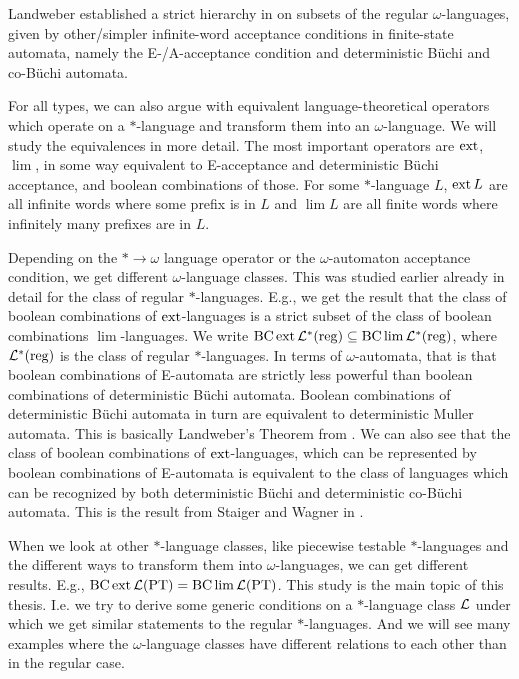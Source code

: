 Landweber established a strict hierarchy in \cite{Landweber69} on subsets of the regular $\omega$-languages, given by other/simpler infinite-word acceptance conditions in finite-state automata, namely the E-/A-acceptance condition and deterministic Büchi and co-Büchi automata.

For all types, we can also argue with equivalent language-theoretical operators which operate on a $*$-language and transform them into an $\omega$-language. We will study the equivalences in more detail. The most important operators are $\operatorname{ext}$, $\lim$, in some way equivalent to E-acceptance and deterministic Büchi acceptance, and boolean combinations of those. For some $*$-language $L$, $\operatorname{ext} L$ are all infinite words where some prefix is in $L$ and $\lim L$ are all finite words where infinitely many prefixes are in $L$.

Depending on the $* \rightarrow \omega$ language operator or the $\omega$-automaton acceptance condition, we get different $\omega$-language classes. This was studied earlier already in detail for the class of regular $*$-languages. E.g., we get the result that the class of boolean combinations of $\operatorname{ext}$-languages is a strict subset of the class of boolean combinations $\lim$-languages. We write $\operatorname{BC} \operatorname{ext} \mathcal{L}^*(\textup{\textrm{reg}}) \subseteq \operatorname{BC} \lim \mathcal{L}^*(\textup{\textrm{reg}})$, where $\mathcal{L}^*(\textup{\textrm{reg}})$ is the class of regular $*$-languages. In terms of $\omega$-automata, that is that boolean combinations of E-automata are strictly less powerful than boolean combinations of deterministic Büchi automata. Boolean combinations of deterministic Büchi automata in turn are equivalent to deterministic Muller automata. This is basically Landweber's Theorem from \cite{Landweber69}. We can also see that the class of boolean combinations of $\operatorname{ext}$-languages, which can be represented by boolean combinations of E-automata is equivalent to the class of languages which can be recognized by both deterministic Büchi and deterministic co-Büchi automata. This is the result from Staiger and Wagner in \cite{StaigerW74}.

When we look at other $*$-language classes, like piecewise testable $*$-languages and the different ways to transform them into $\omega$-languages, we can get different results. E.g., $\operatorname{BC} \operatorname{ext} \mathcal{L}(\textup{\textrm{PT}}) = \operatorname{BC} \lim \mathcal{L}(\textup{\textrm{PT}})$. This study is the main topic of this thesis. I.e. we try to derive some generic conditions on a $*$-language class $\mathcal{L}$ under which we get similar statements to the regular $*$-languages. And we will see many examples where the $\omega$-language classes have different relations to each other than in the regular case.

